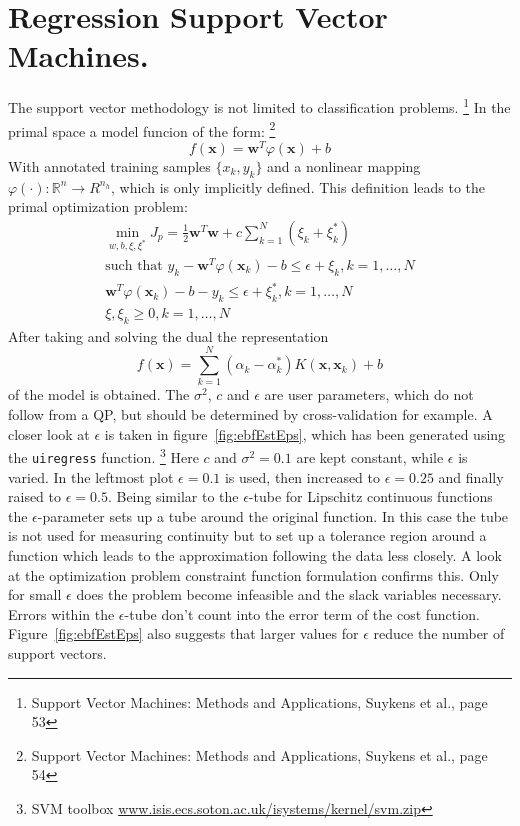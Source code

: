 \section{Regression Support Vector Machines.}
The support vector methodology is not limited to classification problems. \footnote{Support Vector Machines: Methods and Applications, Suykens et al., page 53} In the primal space a model funcion of the form: \footnote{Support Vector Machines: Methods and Applications, Suykens et al., page 54}
\begin{equation}
f(\mathbf{x}) = \mathbf{w}^T \varphi(\mathbf{x}) + b 
\end{equation}
With annotated training samples $\{x_k,y_k\}$ and a nonlinear mapping $\varphi(\cdot) : \mathbb{R}^n \rightarrow R^{n_h}$, which is only implicitly defined. This definition leads to the primal optimization problem:
\begin{align}
\min_{w, b, \xi, \xi^{*}} J_p = \frac{1}{2} \mathbf{w}^T\mathbf{w} + c\sum_{k=1}^{N}(\xi_k + \xi_k^{*}) \\
\text{such that } y_k - \mathbf{w}^T\varphi(\mathbf{x}_k) - b \leq \epsilon  + \xi_k , k = 1,\dots,N \\ 
\mathbf{w}^T\varphi(\mathbf{x}_k) - b - y_k \leq \epsilon  + \xi_k^{*} , k = 1,\dots,N \\
\xi, \xi_k \geq 0 , k = 1,\dots,N
\end{align}
After taking and solving the dual the representation
\begin{equation}
f(\mathbf{x}) = \sum\limits_{k=1}^{N} (\alpha_k - \alpha_k^{*})K(\mathbf{x},\mathbf{x}_k) + b
\label{eq:Ksum}
\end{equation}
of the model is obtained. The $\sigma^2$, $c$ and $\epsilon$ are user parameters, which do not follow from a QP, but should be determined by cross-validation for example. A closer look at $\epsilon$ is taken in figure~\ref{fig:ebfEstEps}, which has been generated using the \texttt{uiregress} function. \footnote{SVM toolbox \url{www.isis.ecs.soton.ac.uk/isystems/kernel/svm.zip}} Here $c$ and $\sigma^2 = 0.1$ are kept constant, while $\epsilon$ is varied. In the leftmost plot $\epsilon = 0.1$ is used, then increased to $\epsilon = 0.25$ and finally raised to $\epsilon = 0.5$. Being similar to the $\epsilon$-tube for Lipschitz continuous functions the $\epsilon$-parameter sets up a tube around the original function. In this case the tube is not used for measuring continuity but to set up a tolerance region around a function which leads to the approximation following the data less closely. A look at the optimization problem constraint function formulation confirms this. Only for small $\epsilon$ does the problem become infeasible and the slack variables necessary. Errors within the $\epsilon$-tube don't count into the error term of the cost function. Figure~\ref{fig:ebfEstEps} also suggests that larger values for $\epsilon$ reduce the number of support vectors.
